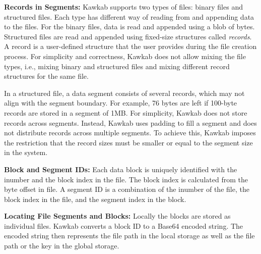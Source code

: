 \documentclass[]{article}
\newcommand{\subtopic}[1]{\vspace{1.5pt} \noindent \textbf{#1}}
\begin{document}

\subtopic{Records in Segments:} 
Kawkab supports two types of files: binary files and structured files.
Each type has different way of reading from and appending data to the files.
For the binary files, data is read and appended using a blob of bytes.
Structured files are read and appended using fixed-size structures
called \textit{records}. A record is a user-defined structure that
the user provides during the file creation process.
For simplicity and correctness, Kawkab does not allow mixing the file
types,
i.e., mixing binary and
structured files and mixing different record structures for the same file.


In a structured file, a data segment consists of several records, which may not
align with the segment boundary. For example, 76 bytes are left if 100-byte
records are stored in a segment of 1MB. For simplicity, Kawkab does not store
records across segments.  Instead, Kawkab uses padding to fill a segment and
does not distribute records across multiple segments. To achieve this, Kawkab
imposes the restriction that the record sizes must be smaller or equal to the
segment size in the system. 



\subtopic{Block and Segment IDs:} Each data block is uniquely identified with
the inumber and the block index in the file.  The block index is calculated
from the byte offset in file.  A segment ID is a combination of the inumber of
the file, the block index in the file, and the segment index in the block.


\subtopic{Locating File Segments and Blocks:} Locally the blocks are stored as
individual files.  Kawkab converts a block ID to a Base64 encoded string. The
encoded string then represents the file path in the local storage as well as
the file path or the key in the global storage.
\end{document}
